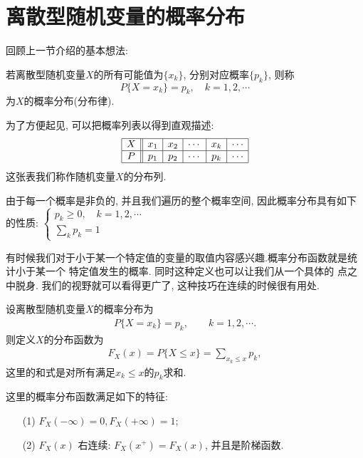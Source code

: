 \section{离散型随机变量的概率分布}
回顾上一节介绍的基本想法: 
\begin{definition}[概率分布]
    若离散型随机变量$X$的所有可能值为$\{x_k\}$, 分别对应概率$\{p_k\}$, 则称
    $$P\{X=x_k\}=p_k, \quad k=1,2,\cdots$$
    为$X$的概率分布(分布律).
\end{definition}

为了方便起见, 可以把概率列表以得到直观描述:
\[\begin{array}{|c||c|c|c|c|c|}\hline
        X & x_1 & x_2 & \cdots & x_k & \cdots \\ \hline
        P & p_1 & p_2 & \cdots & p_k & \cdots \\ \hline
    \end{array}\]
这张表我们称作随机变量$X$的分布列.

由于每一个概率是非负的, 并且我们遍历的整个概率空间, 因此概率分布具有如下的性质:
$\displaystyle \left\{ \begin{array}{l} p_k\ge 0, \quad k=1,2,\cdots \\
        \sum\limits_{k}{p_k}=1\end{array} \right.$

有时候我们对于小于某一个特定值的变量的取值内容感兴趣.概率分布函数就是统计小于某一个
特定值发生的概率.
同时这种定义也可以让我们从一个具体的
点之中脱身. 我们的视野就可以看得更广了, 这种技巧在连续的时候很有用处.

\begin{definition}[概率分布函数]
    设离散型随机变量$X$的概率分布为
    \begin{align*}
        P\{X=x_k\}=p_k,\qquad k=1,2,\cdots.
    \end{align*}
    则定义$X$的分布函数为
    \begin{align*}
        F_X(x)=P\{X\le x\}=\sum_{x_k\le x} p_k,
    \end{align*}
    这里的和式是对所有满足$x_k\le x$的$p_k$求和. 
\end{definition}

这里的概率分布函数满足如下的特征: 
\begin{itemize}
    \item [(1)] $F_{X}(-\infty)=0, F_{X}(+\infty)=1$;
    \item [(2)] $F_{X}(x)$ 右连续: $F_{X}(x^+)=F_{X}(x)$, 并且是阶梯函数.
\end{itemize}


